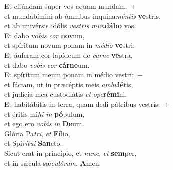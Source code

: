 \evenverse Et effúndam super vos aquam mundam,~+\\\evenverse  et mundabímini ab ómnibus inquina\textit{mén}\textit{tis} \textbf{ve}stris,~\*\\
\evenverse et ab univérsis idólis \textit{ve}\textit{stris} \textit{mun}\textbf{dá}\textbf{bo} vos.\\
\oddverse Et dabo vo\textit{bis} \textit{cor} \textbf{no}vum,~\*\\
\oddverse et spíritum novum ponam in \textit{mé}\textit{di}\textit{o} \textbf{ve}stri:\\
\evenverse Et áuferam cor lapídeum de \textit{car}\textit{ne} \textbf{ve}stra,~\*\\
\evenverse et dabo \textit{vo}\textit{bis} \textit{cor} \textbf{cár}\textbf{ne}um.\\
\oddverse Et spíritum meum ponam in médio vestri:~+\\
\oddverse  et fáciam, ut in præcéptis meis \textit{am}\textit{bu}\textbf{lé}tis,~\*\\
\oddverse et judícia mea custodiátis \textit{et} \textit{o}\textit{pe}\textbf{ré}\textbf{mi}ni.\\
\evenverse Et habitábitis in terra, quam dedi pátribus vestris:~+\\
\evenverse  et éritis mi\textit{hi} \textit{in} \textbf{pó}pulum,~\*\\
\evenverse et ego ero \textit{vo}\textit{bis} \textit{in} \textbf{De}um.\\
\oddverse Glória Pa\textit{tri}, \textit{et} \textbf{Fí}lio,~\*\\
\oddverse et Spi\textit{rí}\textit{tu}\textit{i} \textbf{San}cto.\\
\evenverse Sicut erat in princípio, et \textit{nunc}, \textit{et} \textbf{sem}per,~\*\\
\evenverse et in sǽcula sæ\textit{cu}\textit{ló}\textit{rum}. \textbf{A}men.\\

